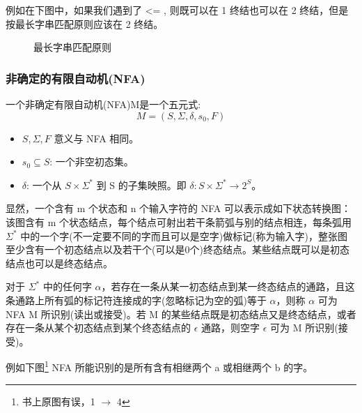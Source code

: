 例如在下图中，如果我们遇到了 <= , 则既可以在 1 终结也可以在 2 终结，但是按最长字串匹配原则应该在 2 终结。

\begin{figure}[H]
    \centering
    \caption{最长字串匹配原则}
    \label{fig:最长字串匹配原则}
\end{figure}

\subsubsection{\textcolor{imp}{非确定的有限自动机(NFA)}}

一个非确定有限自动机(NFA)M是一个五元式:
\[ M = (S,\Sigma,\delta,s_0,F) \]

\begin{itemize}
    \item $S,\Sigma,F$ 意义与 NFA 相同。
    \item $s_0 \subseteq S$: 一个非空初态集。
    \item $\delta$: 一个从 $S \times \Sigma^*$ 到 S 的子集映照。即 $\delta:S\times \Sigma^* \rightarrow 2^S$。
\end{itemize}

显然，一个含有 m 个状态和 n 个输入字符的 NFA 可以表示成如下状态转换图：该图含有 m 个状态结点，每个结点可射出若干条箭弧与别的结点相连，每条弧用 $\Sigma^*$ 中的一个字(不一定要不同的字而且可以是空字)做标记(称为输入字)，整张图至少含有一个初态结点以及若干个(可以是0个)终态结点。某些结点既可以是初态结点也可以是终态结点。

对于 $\Sigma^*$ 中的任何字 $\alpha$，若存在一条从某一初态结点到某一终态结点的通路，且这条通路上所有弧的标记符连接成的字(忽略标记为空的弧)等于 $\alpha$，则称 $\alpha$ 可为 NFA M 所识别(读出或接受)。若 M 的某些结点既是初态结点又是终态结点，或者存在一条从某个初态结点到某个终态结点的 $\epsilon$ 通路，则空字 $\epsilon$ 可为 M 所识别(接受)。

例如下图\footnote{书上原图有误，1 $\rightarrow$ 4} NFA 所能识别的是所有含有相继两个 a 或相继两个 b 的字。


